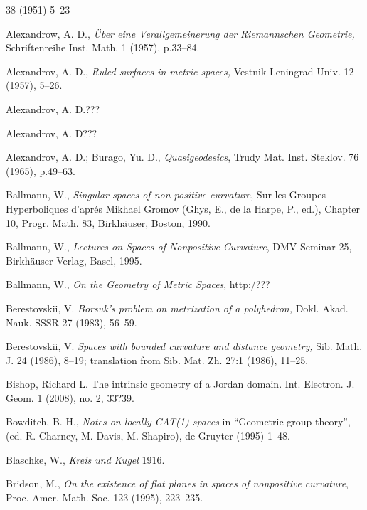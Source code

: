 \begin{thebibliography}{52}
38 (1951) 5--23

 Alexandrow, A. D.,  \textit{\"Uber eine Verallgemeinerung der Riemannschen Geometrie,}
Schriftenreihe Inst. Math. 1 (1957), p.33--84.

 Alexandrov, A. D., \textit{Ruled surfaces in metric spaces,}
Vestnik Leningrad Univ. 12  (1957), 5--26.

 Alexandrov, A. D.???

 Alexandrov, A. D???

 Alexandrov, A. D.; Burago, Yu. D., \textit{Quasigeodesics}, Trudy Mat. Inst. Steklov.
76 (1965), p.49--63.

Ballmann, W., \textit{Singular spaces of non-positive curvature}, Sur les Groupes Hyperboliques d'apr\'{e}s Mikhael Gromov (Ghys, E., de la Harpe, P., ed.), Chapter 10, Progr. Math. 83, Birkh\"auser, Boston, 1990. 


Ballmann, W., \textit{Lectures on Spaces of Nonpositive Curvature}, DMV Seminar 25, Birkh\"auser Verlag, Basel, 1995. 

Ballmann, W., \textit{On the Geometry of Metric Spaces}, http:/???

 Berestovskii, V. 
\textit{Borsuk's problem on metrization of a polyhedron,}  
Dokl. Akad. Nauk. SSSR 27 (1983), 56--59.

 Berestovskii, V. 
\textit{Spaces with bounded curvature and distance geometry,}  
Sib. Math. J. 24 (1986), 8--19;
translation from Sib. Mat. Zh. 27:1 (1986), 11--25.

Bishop, Richard L. The intrinsic geometry of a Jordan domain. Int. Electron. J. Geom. 1 (2008), no. 2, 33?39.

 Bowditch, B. H.,
\textit{Notes on locally CAT(1) spaces} 
in ``Geometric group theory'', (ed. R. Charney, M. Davis, M. Shapiro), de Gruyter (1995) 1--48.

 Blaschke, W., \textit{Kreis und Kugel} 1916.

Bridson, M.,
\textit{On the existence of flat planes in spaces of nonpositive curvature},
Proc. Amer. Math. Soc. 123 (1995), 223--235.


\end{thebibliography}
